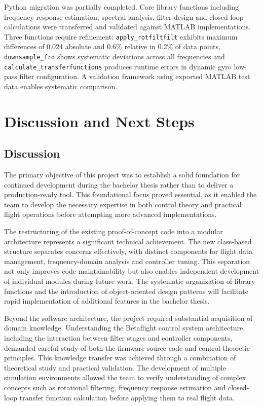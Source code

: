 \documentclass[a4paper,11pt]{scrartcl}
\begin{document}
Python migration was partially completed. Core library functions including frequency response estimation, spectral analysis, filter design and closed-loop calculations were transferred and validated against MATLAB implementations. Three functions require refinement: \texttt{apply\_rotfiltfilt} exhibits maximum differences of 0.024 absolute and 0.6\% relative in 0.2\% of data points, \texttt{downsample\_frd} shows systematic deviations across all frequencies and \texttt{calculate\_transferfunctions} produces runtime errors in dynamic gyro low-pass filter configuration. A validation framework using exported MATLAB test data enables systematic comparison.

\clearpage

\section{Discussion and Next Steps}
\label{sec:DiscussionAndNextSteps}

\subsection{Discussion}

The primary objective of this project was to establish a solid foundation for continued development during the bachelor thesis rather than to deliver a production-ready tool. This foundational focus proved essential, as it enabled the team to develop the necessary expertise in both control theory and practical flight operations before attempting more advanced implementations.

The restructuring of the existing proof-of-concept code into a modular architecture represents a significant technical achievement. The new class-based structure separates concerns effectively, with distinct components for flight data management, frequency-domain analysis and controller tuning. This separation not only improves code maintainability but also enables independent development of individual modules during future work. The systematic organization of library functions and the introduction of object-oriented design patterns will facilitate rapid implementation of additional features in the bachelor thesis.

Beyond the software architecture, the project required substantial acquisition of domain knowledge. Understanding the Betaflight control system architecture, including the interaction between filter stages and controller components, demanded careful study of both the firmware source code and control-theoretic principles. This knowledge transfer was achieved through a combination of theoretical study and practical validation. The development of multiple simulation environments allowed the team to verify understanding of complex concepts such as rotational filtering, frequency response estimation and closed-loop transfer function calculation before applying them to real flight data.
\end{document}

